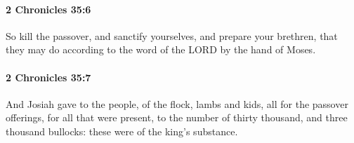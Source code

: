 		\paragraph{2 Chronicles 35:6} %
			\label{2CHRONICLES-35-6}

			So kill the passover, and sanctify yourselves, and prepare your brethren, that they may do according to the word of the LORD by the hand of Moses.


		\paragraph{2 Chronicles 35:7} %
			\label{2CHRONICLES-35-7}

			And Josiah gave to the people, of the flock, lambs and kids, all for the passover offerings, for all that were present, to the number of thirty thousand, and three thousand bullocks: these were of the king's substance.

